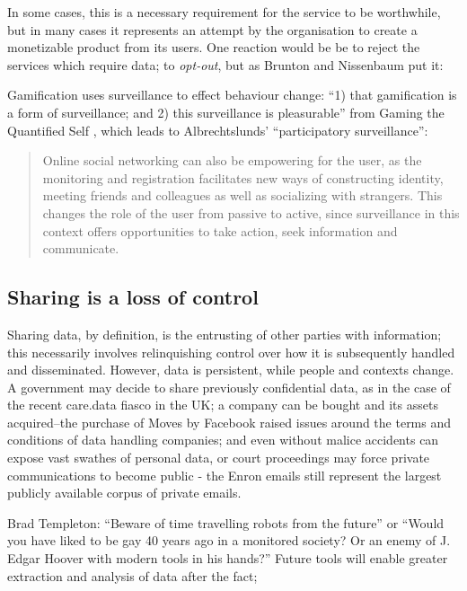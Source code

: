 \documentclass{IOS-Book-Article}     %
\begin{document}
In some cases, this is a
necessary requirement for the service to be worthwhile, but in many cases it
represents an attempt by the organisation to create a monetizable product from
its users. One reaction would be be to reject the services which require data;
to \emph{opt-out}, but as Brunton and Nissenbaum put it:
\cite{brunton2011vernacular}

Gamification uses surveillance to effect behaviour change:
``1) that gamification is a form of surveillance; and 2) this surveillance is
pleasurable'' from Gaming the Quantified Self \cite{whitson2013gaming}, which
leads to  Albrechtslunds' ``participatory
surveillance''\cite{albechtslund2008online}:
\begin{quote}
Online social networking can also be empowering for the user, as the monitoring and 
registration facilitates new ways of constructing identity, meeting friends and colleagues 
as well as socializing with strangers. This changes the role of the user from passive to 
active, since surveillance in this context offers opportunities to take action, seek 
information and communicate. 
\end{quote} 


\subsection*{Sharing is a loss of control}

Sharing data, by definition, is the entrusting of other parties with
information; this necessarily involves relinquishing control over how it is
subsequently handled and disseminated. However, data is persistent, while people
and contexts change. A government may decide to share previously confidential
data, as in the case of the recent care.data fiasco in the UK; a company can be
bought and its assets acquired–the purchase of Moves by Facebook raised issues
around the terms and conditions of data handling companies; and even without
malice accidents can expose vast swathes of personal data, or court proceedings
may force private communications to become public - the Enron emails still
represent the largest publicly available corpus of private emails.  

Brad Templeton: ``Beware of time travelling robots from the future'' or ``Would
you have liked to be gay 40 years ago in a monitored society? Or an enemy of J.
Edgar Hoover with modern tools in his hands?'' \cite{templetonWatched}
Future tools will enable greater extraction and analysis of data after the fact;
\end{document}
